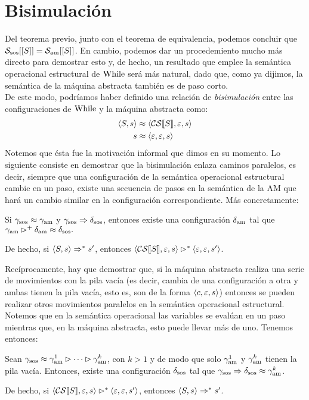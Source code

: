 \section{Bisimulación}

Del teorema previo, junto con el teorema de equivalencia, podemos concluir que $\mathcal{S}_{\mathrm{sos}}[[S]] = \mathcal{S}_{\mathrm{am}}[[S]]$. En cambio, podemos dar un procedemiento mucho más directo para demostrar esto y, de hecho, un resultado que emplee la semántica operacional estructural de $\mathrm{While}$ será más natural, dado que, como ya dijimos, la semántica de la máquina abstracta también es de paso corto.
\\

De este modo, podríamos haber definido una relación de \textit{bisimulación} entre las configuraciones de $\mathrm{While}$ y la máquina abstracta como:
\begin{align*}
    \langle S, s \rangle & \approx \langle \mathcal{CS}[\![S]\!], \varepsilon, s \rangle\\
    s & \approx \langle \varepsilon, \varepsilon, s \rangle
\end{align*}
Notemos que ésta fue la motivación informal que dimos en su momento. Lo siguiente consiste en demostrar que la bisimulación enlaza caminos paralelos, es decir, siempre que una configuración de la semántica operacional estructural cambie en un paso, existe una secuencia de pasos en la semántica de la AM que hará un cambio similar en la configuración correspondiente. Más concretamente:
\begin{lema}
Si $\gamma_{\mathrm{sos}} \approx \gamma_{\mathrm{am}}$ y $\gamma_{\mathrm{sos}}\Rightarrow\delta_{\mathrm{sos}}$, entonces existe una configuración $\delta_{\mathrm{am}}$ tal que $\gamma_{\mathrm{am}} \rhd^+ \delta_{\mathrm{am}} \approx \delta_{\mathrm{sos}}.$ 

De hecho, si $\langle S, s \rangle\Rightarrow^* s'$, entonces $\langle \mathcal{CS}[\![S]\!], \varepsilon, s \rangle\rhd^* \langle \varepsilon, \varepsilon, s' \rangle$.
\end{lema}

Recíprocamente, hay que demostrar que, si la máquina abstracta realiza una serie de movimientos con la pila vacía (es decir, cambia de una configuración a otra y ambas tienen la pila vacía, esto es, son de la forma $\langle c, \varepsilon, s \rangle$) entonces se pueden realizar otros movimientos paralelos en la semántica operacional estructural. Notemos que en la semántica operacional las variables se evalúan en un paso mientras que, en la máquina abstracta, esto puede llevar más de uno. Tenemos entonces:
\begin{lema}
Sean $\gamma_{\mathrm{sos}}\approx \gamma_{\mathrm{am}}^1 \rhd \dots \rhd \gamma_{\mathrm{am}}^k$, con $k>1$ y de modo que solo $\gamma_{\mathrm{am}}^1$ y $\gamma_{\mathrm{am}}^k$ tienen la pila vacía. Entonces, existe una configuración $\delta_{\mathrm{sos}}$ tal que $\gamma_{\mathrm{sos}}\Rightarrow \delta_{\mathrm{sos}}\approx \gamma_{\mathrm{am}}^k$. 

De hecho, si $\langle \mathcal{CS}[\![S]\!], \varepsilon, s \rangle\rhd^* \langle \varepsilon, \varepsilon, s' \rangle$, entonces $\langle S, s \rangle\Rightarrow^* s'$.
\end{lema}

